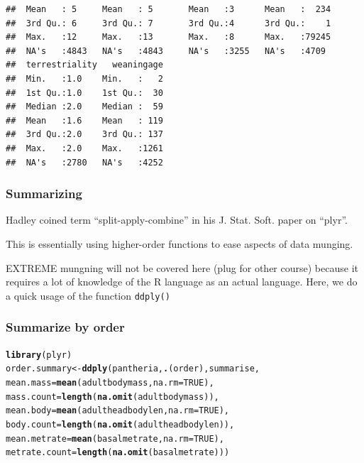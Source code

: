 \documentclass{beamer}\usepackage{graphicx, color}
\makeatletter
\newcommand{\hlfunctioncall}[1]{\textcolor[rgb]{0.501960784313725,0,0.329411764705882}{\textbf{#1}}}%
\newenvironment{kframe}{%
 \def\at@end@of@kframe{}%
 \ifinner\ifhmode%
  \def\at@end@of@kframe{\end{minipage}}%
  \begin{minipage}{\columnwidth}%
 \fi\fi%
 \def\FrameCommand##1{\hskip\@totalleftmargin \hskip-\fboxsep
 \colorbox{shadecolor}{##1}\hskip-\fboxsep
     \hskip-\linewidth \hskip-\@totalleftmargin \hskip\columnwidth}%
 \MakeFramed {\advance\hsize-\width
   \@totalleftmargin\z@ \linewidth\hsize
   \@setminipage}}%
 {\par\unskip\endMakeFramed%
 \at@end@of@kframe}
\newenvironment{knitrout}{}{} %
\makeatother
\begin{document}
\begin{frame}[fragile]
\begin{knitrout}
\begin{kframe}
\begin{verbatim}
##  Mean   : 5     Mean   : 5       Mean   :3      Mean   :  234  
##  3rd Qu.: 6     3rd Qu.: 7       3rd Qu.:4      3rd Qu.:    1  
##  Max.   :12     Max.   :13       Max.   :8      Max.   :79245  
##  NA's   :4843   NA's   :4843     NA's   :3255   NA's   :4709   
##  terrestriality   weaningage  
##  Min.   :1.0    Min.   :   2  
##  1st Qu.:1.0    1st Qu.:  30  
##  Median :2.0    Median :  59  
##  Mean   :1.6    Mean   : 119  
##  3rd Qu.:2.0    3rd Qu.: 137  
##  Max.   :2.0    Max.   :1261  
##  NA's   :2780   NA's   :4252
\end{verbatim}
\end{kframe}
\end{knitrout}

\end{frame}

\begin{frame}
  \frametitle{Summarizing}

  Hadley coined term ``split-apply-combine'' in his J. Stat. Soft. paper on ``plyr''.

  This is essentially using higher-order functions to ease aspects of data munging.

  EXTREME mungning will not be covered here (plug for other course) because it requires a lot of knowledge of the R language as an actual language. Here, we do a quick usage of the function \tt{ddply()}

\end{frame}

\begin{frame}[fragile]
  \frametitle{Summarize by order}
\begin{knitrout}\scriptsize
{}\color{fgcolor}\begin{kframe}
\begin{alltt}
\hlfunctioncall{library}(plyr)
order.summary <- \hlfunctioncall{ddply}(pantheria, \hlfunctioncall{.}(order), summarise, 
                       mean.mass = \hlfunctioncall{mean}(adultbodymass, na.rm = TRUE),
                       mass.count = \hlfunctioncall{length}(\hlfunctioncall{na.omit}(adultbodymass)),
                       mean.body = \hlfunctioncall{mean}(adultheadbodylen, na.rm = TRUE),
                       body.count = \hlfunctioncall{length}(\hlfunctioncall{na.omit}(adultheadbodylen)),
                       mean.metrate = \hlfunctioncall{mean}(basalmetrate, na.rm = TRUE),
                       metrate.count = \hlfunctioncall{length}(\hlfunctioncall{na.omit}(basalmetrate)))
\end{alltt}
\end{kframe}
\end{knitrout}


\end{frame}
\end{document}
